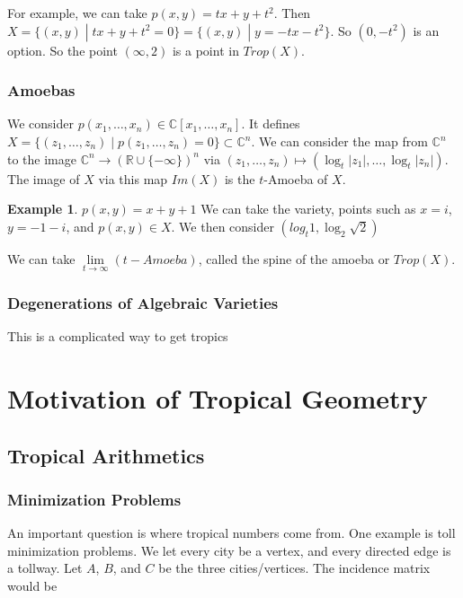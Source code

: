 \documentclass[11pt]{article}
\theoremstyle{definition}
\newtheorem{protoexample}{Example}[section]
\newenvironment{ex}
   {\begin{protoexample}}
   {\end{protoexample}}
\def\RR{{\mathbb R}}
\def\CC{{\mathbb C}}
\begin{document}
For example, we can take $p(x,y) = tx + y + t^2$. Then $X = \{ (x,y) \; |\; tx+y+t^2 = 0\}= \{ (x,y) \; |\; y = -tx -t^2\} $. So $(0,-t^2)$ is an option. So the point $(\infty, 2)$ is a point in $Trop(X)$.



\subsubsection{Amoebas}

We consider $p(x_1, \dots, x_n) \in \CC[x_1, \dots, x_n]$. It defines $ X= \{(z_1, \dots, z_n) \; |\; p(z_1, \dots, z_n) = 0 \} \subset \CC^n$. We can consider the map  from $\CC^n$ to the image $\CC^n  \rightarrow  (\RR \cup \{-\infty\})^n$ via $(z_1, \dots, z_n) \mapsto (\log_t|z_1|, \dots, \log_t |z_n|) $. The image of $X$ via this map $Im(X)$ is the $t$-Amoeba of $X$. 


\begin{ex}
    $p(x,y) = x+y+1$ We can take the variety, points such as $x=i$, $y=-1-i$, and $p(x,y) \in X$. We then consider $(log_t 1, \log_2 \sqrt{2})$
\end{ex}


We can take $\lim\limits_{t \rightarrow \infty} (t-Amoeba)$, called the spine of the amoeba or $Trop(X)$.


\subsubsection{Degenerations of Algebraic Varieties}



This is a complicated way to get tropics



\section{Motivation of Tropical Geometry}

\subsection{Tropical Arithmetics}

\subsubsection{Minimization Problems}

An important question is where tropical numbers come from. One example is toll minimization problems. We let every city be a vertex, and every directed edge is a tollway. Let $A$, $B$, and $C$ be the three cities/vertices. The incidence matrix would be
\end{document}
